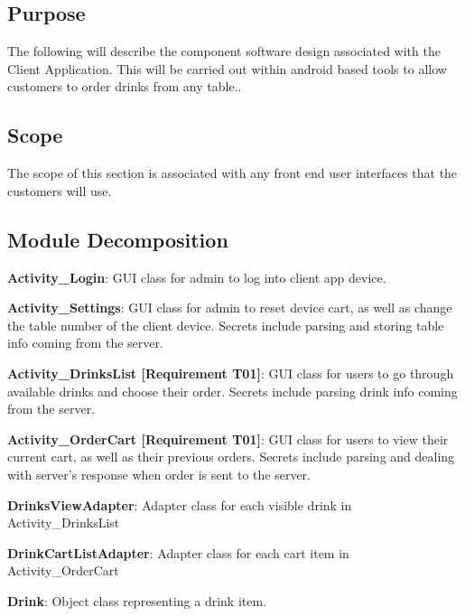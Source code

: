 \documentclass [10pt]{article}
\begin{document}

\subsection{Purpose}
The following will describe the component software design associated with the Client Application. This will be carried out within android based tools to allow customers to order drinks from any table..


\subsection{Scope}
The scope of this section is associated with any front end user interfaces that the customers will use.


\subsection{Module Decomposition}

\textbf{Activity\_Login}: GUI class for admin to log into client app device.

\textbf{Activity\_Settings}: GUI class for admin to reset device cart, as well as change the table number of the client device. Secrets include parsing and storing table info coming from the server.

\textbf{Activity\_DrinksList [Requirement T01]}: GUI class for users to go through available drinks and choose their order. Secrets include parsing drink info coming from the server.

\textbf{Activity\_OrderCart [Requirement T01]}: GUI class for users to view their current cart, as well as their previous orders. Secrets include parsing and dealing with server's response when order is sent to the server.

\textbf{DrinksViewAdapter}: Adapter class for each visible drink in Activity\_DrinksList

\textbf{DrinkCartListAdapter}: Adapter class for each cart item in Activity\_OrderCart

\textbf{Drink}: Object class representing a drink item.
\end{document}
